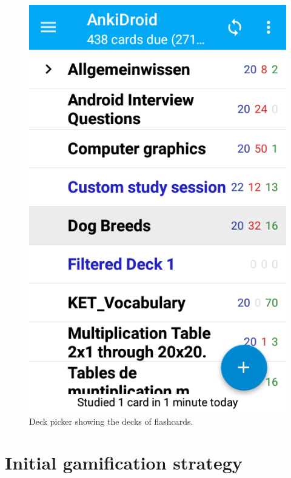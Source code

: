 \begin{figure}[htb]
    \vskip 5mm
        \begin{center}
            \includegraphics[scale=0.4]{./Figures/picker.png}
            \caption{Deck picker showing the decks of flashcards.}
            \label{fig:deck-picker}
        \end{center}
    \vskip -5mm
\end{figure}

\section{Initial gamification strategy}
\label{desi-gamification-strategy}

